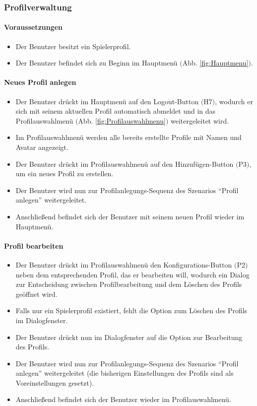 \subsubsection{Profilverwaltung}
\paragraph{Voraussetzungen}
\begin{itemize}
	\item Der Benutzer besitzt ein Spielerprofil.
	\item Der Benutzer befindet sich zu Beginn im Hauptmenü $($Abb. \ref{fig:Hauptmenu}$)$.
\end{itemize}
\paragraph{Neues Profil anlegen}
\begin{itemize}
	\item Der Benutzer drückt im Hauptmenü auf den Logout-Button $($H7$)$, wodurch er sich mit seinem aktuellen Profil automatisch abmeldet und in das Profilauswahlmenü $($Abb. \ref{fig:Profilauswahlmenu}$)$ weitergeleitet wird.
	\item Im Profilauswahlmenü werden alle bereits erstellte Profile mit Namen und Avatar angezeigt.
	\item Der Benutzer drückt im Profilauswahlmenü auf den Hinzufügen-Button $($P3$)$, um ein neues Profil zu erstellen.
	\item Der Benutzer wird nun zur Profilanlegungs-Sequenz des Szenarios "`Profil anlegen"' weitergeleitet.
	\item Anschließend befindet sich der Benutzer mit seinem neuen Profil wieder im Hauptmenü.
\end{itemize}
\paragraph{Profil bearbeiten }
\begin{itemize}
	\item Der Benutzer drückt im Profilauswahlmenü den Konfigurations-Button $($P2$)$ neben dem entsprechenden Profil, das er bearbeiten will, wodurch ein Dialog zur Entscheidung zwischen Profilbearbeitung und dem Löschen des Profils geöffnet wird.
	\item Falls nur ein Spielerprofil existiert, fehlt die Option zum Löschen des Profils im Dialogfenster.
	\item Der Benutzer drückt nun im Dialogfenster auf die Option zur Bearbeitung des Profils. 
	\item Der Benutzer wird nun zur Profilanlegungs-Sequenz des Szenarios "`Profil anlegen"' weitergeleitet (die bisherigen Einstellungen des Profils sind als Voreinstellungen gesetzt).
	\item Anschließend befindet sich der Benutzer wieder im Profilauswahlmenü.
\end{itemize}


